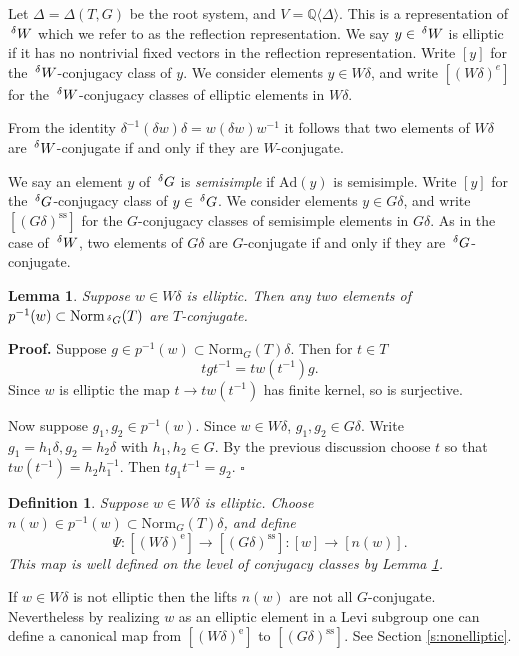 \documentclass[10pt,leqno]{article}
\newtheorem{definition}[equation]{Definition}
\newtheorem{lemma}[equation]{Lemma}
\newcommand{\qed}{\hfill $\square$ \medskip}
\newenvironment{proof}[1][Proof]{\noindent\textbf{#1.} }{\qed}
\newcommand{\Ad}{\text{Ad}}
\newcommand{\Norm}{\text{Norm}}
\newcommand{\Q}{\mathbb Q}
\newcommand\inv{^{-1}}
\renewcommand{\ss}{\text{ss}}
\newcommand{\e}{\text{e}}
\newcommand{\Wext}{\negthinspace\negthinspace\phantom{a}^\delta W}
\newcommand{\Gext}{\negthinspace\negthinspace\phantom{a}^\delta G}
\begin{document}
Let $\Delta=\Delta(T,G)$ be the root system, and
$V=\Q\langle\Delta\rangle$. This is a representation of $\Wext$ which
we refer to as the reflection representation.  We say $y\in\Wext$ is
elliptic if it has no nontrivial fixed vectors in the reflection
representation.  Write $[y]$ for the $\Wext$-conjugacy class of
$y$. We consider elements $y\in W\delta$, and write $[(W\delta)^e]$
for the $\Wext$-conjugacy classes of elliptic elements in $W\delta$.

From the identity $\delta\inv(\delta w)\delta=w(\delta w)w\inv$ it
follows that two elements of $W\delta$ are $\Wext$-conjugate if and
only if they are $W$-conjugate.

We say an element $y$ of $\Gext$ is {\it semisimple} if $\Ad(y)$ is
semisimple.  Write $[y]$ for the $\Gext$-conjugacy class of
$y\in \Gext$. We consider elements $y\in G\delta$, and write
$[(G\delta)^{\ss}]$ for the $G$-conjugacy classes of semisimple
elements in $G\delta$.  As in the case of $\Wext$, two elements of
$G\delta$ are $G$-conjugate if and only if they are $\Gext$-conjugate.

\begin{lemma}
\label{l:conjugate}
Suppose $w\in W\delta$ is elliptic.
Then any two
elements of $p\inv(w)\subset\Norm_{\Gext}(T)$ are $T$-conjugate.
\end{lemma}

\begin{proof}
Suppose $g\in p\inv(w)\subset \Norm_G(T)\delta$. 
Then for $t\in T$
$$
tgt\inv=tw(t\inv)g.
$$
Since $w$ is elliptic the map $t\rightarrow tw(t\inv)$ has finite
kernel, so is surjective.

Now suppose $g_1,g_2\in p\inv(w)$.
Since $w\in W\delta$, $g_1,g_2\in G\delta$. Write $g_1=h_1\delta,g_2=h_2\delta$ with $h_1,h_2\in G$.
By the previous discussion choose $t$ so that $tw(t\inv)=h_2h_1\inv$. Then $tg_1t\inv=g_2$.
\end{proof}

\begin{definition}
 \label{d:basictwisted}
Suppose $w\in W\delta$ is elliptic.
Choose $n(w)\in p\inv(w)\subset \Norm_G(T)\delta$, and define
$$
\Psi: [(W\delta)^\e]\rightarrow[(G\delta)^{\ss}]: [w]\rightarrow [n(w)].
$$
This map is well defined on the level of conjugacy classes by Lemma \ref{l:conjugate}.
\end{definition}

If $w\in W\delta$ is not elliptic then the lifts $n(w)$ are not all $G$-conjugate. Nevertheless
by realizing $w$ as an elliptic element in a Levi subgroup one can define a canonical map
from $[(W\delta)^\e]$ to $[(G\delta)^{\ss}]$. See Section \ref{s:nonelliptic}.
\end{document}
